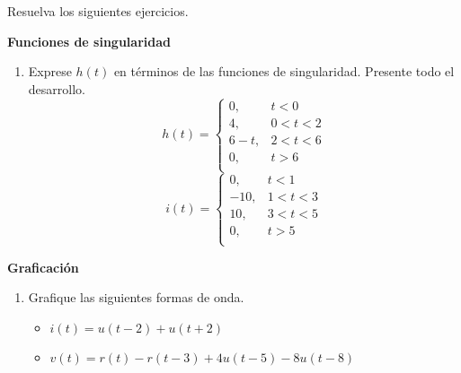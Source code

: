 \documentclass[12pt]{article}
\begin{document}

\noindent Resuelva los siguientes ejercicios.

\textbf{Funciones de singularidad}
\begin{enumerate}
    \item Exprese $h(t)$ en términos de las funciones de singularidad. Presente todo el desarrollo.\\ 
     \begin{equation}
      h(t) = \left\lbrace
      \begin{array}{ll}
      0, & t<0 \\
      4, & 0<t<2 \\
      6-t, & 2<t<6\\
      0, & t>6 \\
      \end{array}
      \right.
      \end{equation}
      \begin{equation}
      i(t) = \left\lbrace
      \begin{array}{ll}
      0, & t<1 \\
      -10, & 1<t<3 \\
      10, & 3<t<5\\
      0, & t>5 \\
      \end{array}
      \right.
      \end{equation}

\end{enumerate}

\textbf{Graficación}


\begin{enumerate}[resume]
   

    \item Grafique las siguientes formas de onda.
    \begin{itemize} 
        \item $i(t) = u(t-2) + u(t+2)$
        \item  $v(t) = r(t) - r(t-3)+ 4u(t-5) - 8u(t-8)$
    \end{itemize}
        
\end{enumerate}
\end{document}
